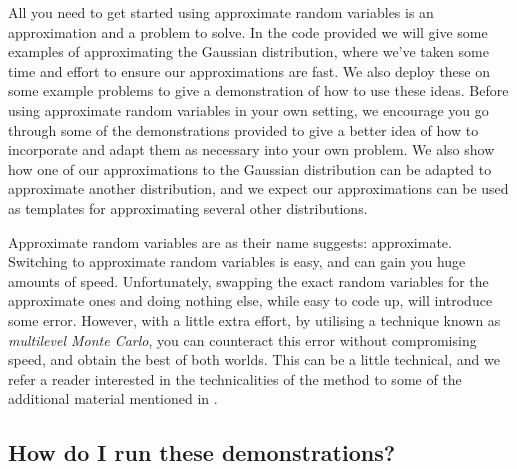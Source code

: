 \documentclass[11pt,a4paper,oneside,english]{extarticle}
\begin{document}
All you need to get started using approximate random variables is an approximation and a problem to solve. In the code provided we will give some examples of approximating the Gaussian distribution, where we've taken some time and effort to ensure our approximations are fast. We also deploy these on some example problems to give a demonstration of how to use these ideas. Before using approximate random variables in your own setting, we encourage you go through some of the demonstrations provided to give a better idea of how to incorporate and adapt them as necessary into your own problem. We also show how one of our approximations to the Gaussian distribution can be adapted to approximate another distribution, and we expect our approximations can be used as templates for approximating several other distributions. 

Approximate random variables are as their name suggests: approximate. Switching to approximate random variables is easy, and can gain you huge amounts of speed. Unfortunately, swapping the exact random variables for the approximate ones and doing nothing else, while easy to code up, will introduce some error. However, with a little extra effort, by utilising a technique known as \emph{multilevel Monte Carlo}, you can counteract this error without compromising speed, and obtain the best of both worlds. This can be a little technical, and we refer a reader interested in the technicalities of the method to some of the additional material mentioned in .


\subsection{How do I run these demonstrations?}
\end{document}
